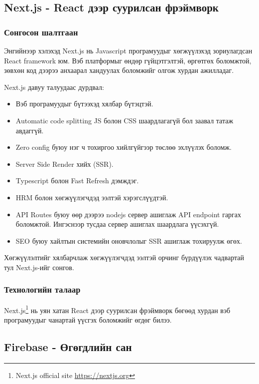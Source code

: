 \subsection{Next.js - React дээр суурилсан фрэймворк}

\subsubsection{Сонгосон шалтгаан}

Энгийнээр хэлэхэд Next.js нь Javascript програмуудыг хөгжүүлэхэд зориулагдсан React framework юм. Вэб платформыг өндөр гүйцэтгэлтэй, өргөтгөх боломжтой, зөвхөн код дээрээ анхаарал хандуулах боломжийг олгож хурдан ажилладаг.

Next.js давуу талуудаас дурдвал:
\begin{itemize}
	\item Вэб програмуудыг бүтээхэд хялбар бүтэцтэй.
	\item Automatic code splitting JS болон CSS шаардлагагүй бол заавал татаж авдаггүй.
	\item Zero config буюу нэг ч тохиргоо хийлгүйгээр төслөө эхлүүлэх боломж.
	\item Server Side Render хийх (SSR).
	\item Typescript болон Fast Refresh дэмждэг.
	\item HRM болон хөгжүүлэгчдэд ээлтэй хэрэгслүүдтэй.
	\item API Routes буюу өөр дээрээ nodejs сервер ашиглаж API endpoint гаргах боломжтой. Ингэснээр тусдаа сервер ашиглах шаардлага үүсэхгүй.
	\item SEO буюу хайлтын системийн оновчлолыг SSR ашиглаж тохируулж өгөх.
\end{itemize}

Хөгжүүлэлтийг хялбарчлаж хөгжүүлэгчдэд ээлтэй орчинг бүрдүүлэх чадвартай тул Next.js-ийг сонгов.

\subsubsection{Технологийн талаар}

Next.js\footnote{Next.js official site \url{https://nextjs.org}} нь уян хатан React дээр суурилсан фрэймворк бөгөөд хурдан вэб програмуудыг чанартай үүсгэх боломжийг өгдөг билээ.


\subsection{Firebase - Өгөгдлийн сан}


